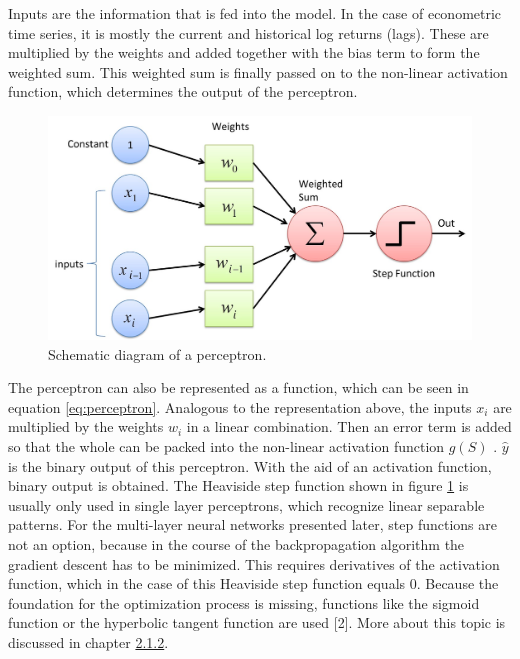 \documentclass[
]{article}
\begin{document}
Inputs are the information that is fed into the model. In the case of
econometric time series, it is mostly the current and historical log
returns (lags). These are multiplied by the weights and added together
with the bias term to form the weighted sum. This weighted sum is
finally passed on to the non-linear activation function, which
determines the output of the perceptron.

\newpage

\begin{figure}

{\centering \includegraphics[width=0.7\linewidth]{images/Perceptron} 

}

\caption{Schematic diagram of a perceptron.}\label{fig:perceptron_schema}
\end{figure}

The perceptron can also be represented as a function, which can be seen
in equation \ref{eq:perceptron}. Analogous to the representation above,
the inputs \(x_{i}\) are multiplied by the weights \(w_{i}\) in a linear
combination. Then an error term is added so that the whole can be packed
into the non-linear activation function \(g(S)\) . \(\hat{y}\) is the
binary output of this perceptron. With the aid of an activation
function, binary output is obtained. The Heaviside step function shown
in figure \ref{fig:perceptron_schema} is usually only used in single
layer perceptrons, which recognize linear separable patterns. For the
multi-layer neural networks presented later, step functions are not an
option, because in the course of the backpropagation algorithm the
gradient descent has to be minimized. This requires derivatives of the
activation function, which in the case of this Heaviside step function
equals 0. Because the foundation for the optimization process is
missing, functions like the sigmoid function or the hyperbolic tangent
function are used {[}2{]}. More about this topic is discussed in chapter
\protect\hyperlink{backprogation_algorithm}{2.1.2}.
\end{document}
